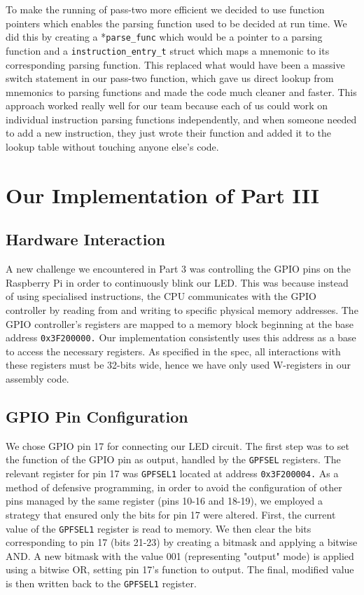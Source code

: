 \documentclass[11pt]{article}
\begin{document}
To make the running of pass-two more efficient we decided to use function pointers which enables the parsing function used to be decided at run time. We did this by creating a *\texttt{parse\_func} which would be a pointer to a parsing function and a \texttt{instruction\_entry\_t} struct which maps a mnemonic to its corresponding parsing function. This replaced what would have been a massive switch statement in our pass-two function, which gave us direct lookup from mnemonics to parsing functions and made the code much cleaner and faster. This approach worked really well for our team because each of us could work on individual instruction parsing functions independently, and when someone needed to add a new instruction, they just wrote their function and added it to the lookup table without touching anyone else's code.

\section{Our Implementation of Part III}

\subsection{Hardware Interaction}

A new challenge we encountered in Part 3 was controlling the GPIO pins on the Raspberry Pi in order to continuously blink our LED. This was because instead of using specialised instructions, the CPU communicates with the GPIO controller by reading from and writing to specific physical memory addresses. The GPIO controller's registers are mapped to a memory block beginning at the base address \texttt{0x3F200000.} Our implementation consistently uses this address as a base to access the necessary registers. As specified in the spec, all interactions with these registers must be 32-bits wide, hence we have only used W-registers in our assembly code.

\subsection{GPIO Pin Configuration}

We chose GPIO pin 17 for connecting our LED circuit. The first step was to set the function of the GPIO pin as output, handled by the \texttt{GPFSEL} registers. The relevant register for pin 17 was \texttt{GPFSEL1} located at address \texttt{0x3F200004.}  As a method of defensive programming, in order to avoid the configuration of other pins managed by the same register (pins 10-16 and 18-19), we employed a strategy that ensured only the bits for pin 17 were altered. First, the current value of the \texttt{GPFSEL1} register is read to memory. We then clear the bits corresponding to pin 17 (bits 21-23) by creating a bitmask and applying a bitwise AND. A new bitmask with the value 001 (representing "output" mode) is applied using a bitwise OR, setting pin 17's function to output. The final, modified value is then written back to the \texttt{GPFSEL1} register.
\end{document}

